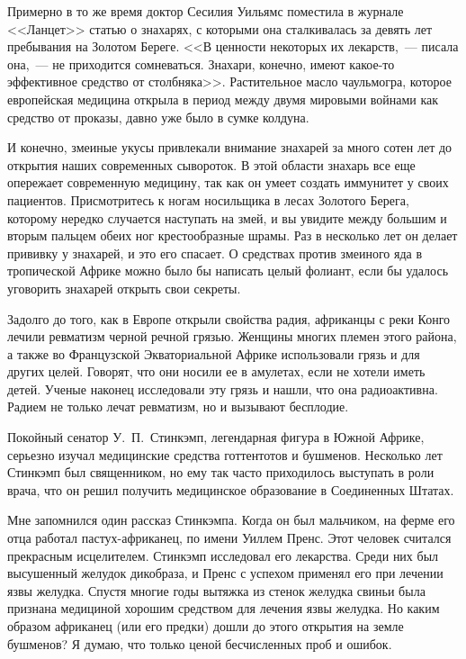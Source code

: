 \documentclass[12pt,a4paper,twoside,openany,svgnames]{memoir}
\begin{document}
Примерно в то же время доктор Сесилия Уильямс поместила в журнале <<Ланцет>> статью о знахарях, с которыми она сталкивалась за девять лет пребывания на Золотом Береге. <<В ценности некоторых их лекарств,~--- писала она,~--- не приходится сомневаться. Знахари, конечно, имеют какое-то эффективное средство от столбняка>>. Растительное масло чаульмогра, которое европейская медицина открыла в период между двумя мировыми войнами как средство от проказы, давно уже было в сумке колдуна.

И конечно, змеиные укусы привлекали внимание знахарей за много сотен лет до открытия наших современных сывороток. В этой области знахарь все еще опережает современную медицину, так как он умеет создать иммунитет у своих пациентов. Присмотритесь к ногам носильщика в лесах Золотого Берега, которому нередко случается наступать на змей, и вы увидите между большим и вторым пальцем обеих ног крестообразные шрамы. Раз в несколько лет он делает прививку у знахарей, и это его спасает. О средствах против змеиного яда в тропической Африке можно было бы написать целый фолиант, если бы удалось уговорить знахарей открыть свои секреты.

Задолго до того, как в Европе открыли свойства радия, африканцы с реки Конго лечили ревматизм черной речной грязью. Женщины многих племен этого района, а также во Французской Экваториальной Африке использовали грязь и для других целей. Говорят, что они носили ее в амулетах, если не хотели иметь детей. Ученые наконец исследовали эту грязь и нашли, что она радиоактивна. Радием не только лечат ревматизм, но и вызывают бесплодие.

Покойный сенатор У.~П.~Стинкэмп, легендарная фигура в Южной Африке, серьезно изучал медицинские средства готтентотов и бушменов. Несколько лет Стинкэмп был священником, но ему так часто приходилось выступать в роли врача, что он решил получить медицинское образование в Соединенных Штатах.

Мне запомнился один рассказ Стинкэмпа. Когда он был мальчиком, на ферме его отца работал пастух-африканец, по имени Уиллем Пренс. Этот человек считался прекрасным исцелителем. Стинкэмп исследовал его лекарства. Среди них был высушенный желудок дикобраза, и Пренс с успехом применял его при лечении язвы желудка. Спустя многие годы вытяжка из стенок желудка свиньи была признана медициной хорошим средством для лечения язвы желудка. Но каким образом африканец (или его предки) дошли до этого открытия на земле бушменов? Я думаю, что только ценой бесчисленных проб и ошибок.
\end{document}
